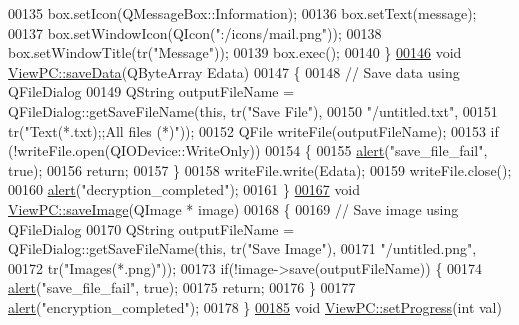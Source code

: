 \begin{DoxyCode}
00135         box.setIcon(QMessageBox::Information);
00136     box.setText(message);
00137     box.setWindowIcon(QIcon(\textcolor{stringliteral}{":/icons/mail.png"}));
00138     box.setWindowTitle(tr(\textcolor{stringliteral}{"Message"}));
00139     box.exec();
00140 \}
\hypertarget{viewpc_8cpp_source.tex_l00146}{}\hyperlink{class_view_p_c_aaff156103970be7c777beedaf0020604}{00146} \textcolor{keywordtype}{void} \hyperlink{class_view_p_c_aaff156103970be7c777beedaf0020604}{ViewPC::saveData}(QByteArray Edata)
00147 \{
00148     \textcolor{comment}{// Save data using QFileDialog}
00149     QString outputFileName = QFileDialog::getSaveFileName(\textcolor{keyword}{this}, tr(\textcolor{stringliteral}{"Save File"}),
00150                                \textcolor{stringliteral}{"/untitled.txt"},
00151                                tr(\textcolor{stringliteral}{"Text(*.txt);;All files (*)"}));
00152     QFile writeFile(outputFileName);
00153     \textcolor{keywordflow}{if} (!writeFile.open(QIODevice::WriteOnly))
00154     \{
00155         \hyperlink{class_view_p_c_a7c467169467789561078abc9d4fe57bd}{alert}(\textcolor{stringliteral}{"save\_file\_fail"}, \textcolor{keyword}{true});
00156         \textcolor{keywordflow}{return};
00157     \}
00158     writeFile.write(Edata);
00159     writeFile.close();
00160     \hyperlink{class_view_p_c_a7c467169467789561078abc9d4fe57bd}{alert}(\textcolor{stringliteral}{"decryption\_completed"});
00161 \}
\hypertarget{viewpc_8cpp_source.tex_l00167}{}\hyperlink{class_view_p_c_a7901ce10ffaaf2387bef1db7feea342d}{00167} \textcolor{keywordtype}{void} \hyperlink{class_view_p_c_a7901ce10ffaaf2387bef1db7feea342d}{ViewPC::saveImage}(QImage * image)
00168 \{
00169     \textcolor{comment}{// Save image using QFileDialog}
00170     QString outputFileName = QFileDialog::getSaveFileName(\textcolor{keyword}{this}, tr(\textcolor{stringliteral}{"Save Image"}),
00171                                \textcolor{stringliteral}{"/untitled.png"},
00172                                tr(\textcolor{stringliteral}{"Images(*.png)"}));
00173     \textcolor{keywordflow}{if}(!image->save(outputFileName)) \{
00174         \hyperlink{class_view_p_c_a7c467169467789561078abc9d4fe57bd}{alert}(\textcolor{stringliteral}{"save\_file\_fail"}, \textcolor{keyword}{true});
00175         \textcolor{keywordflow}{return};
00176     \}
00177     \hyperlink{class_view_p_c_a7c467169467789561078abc9d4fe57bd}{alert}(\textcolor{stringliteral}{"encryption\_completed"});
00178 \}
\hypertarget{viewpc_8cpp_source.tex_l00185}{}\hyperlink{class_view_p_c_a9c32a1fdb6ead84e5ada8fba8860c7ed}{00185} \textcolor{keywordtype}{void} \hyperlink{class_view_p_c_a9c32a1fdb6ead84e5ada8fba8860c7ed}{ViewPC::setProgress}(\textcolor{keywordtype}{int} val)

\end{DoxyCode}
